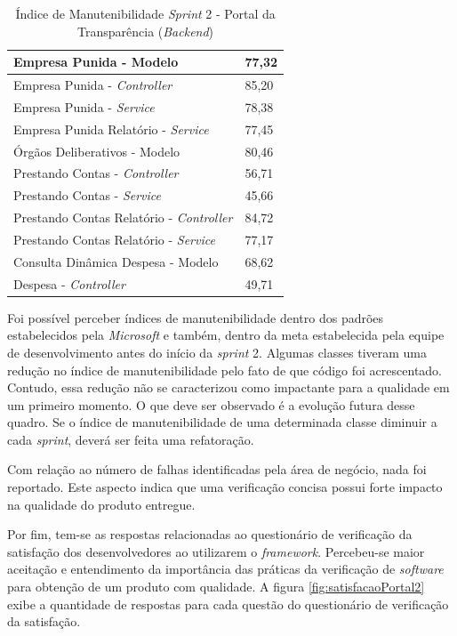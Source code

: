\begin{table}[h]
\caption{Índice de Manutenibilidade \textit{Sprint} 2 - Portal da Transparência (\textit{Backend})}
\centering
\begin{tabular}{ | m{10cm} | m{6cm} | } 
\hline
Empresa Punida - Modelo & 77,32 \\ 
\hline
Empresa Punida - \textit{Controller} & 85,20 \\ 
\hline
Empresa Punida - \textit{Service} & 78,38 \\ 
\hline
Empresa Punida Relatório - \textit{Service} & 77,45 \\ 
\hline
Órgãos Deliberativos - Modelo & 80,46 \\
\hline
Prestando Contas - \textit{Controller} & 56,71 \\
\hline
Prestando Contas - \textit{Service} & 45,66 \\
\hline
Prestando Contas Relatório - \textit{Controller} & 84,72 \\
\hline
Prestando Contas Relatório - \textit{Service} & 77,17 \\
\hline
Consulta Dinâmica Despesa - Modelo & 68,62 \\
\hline
Despesa - \textit{Controller} & 49,71 \\
\hline
\end{tabular}
\label{table:tabela13}
\end{table}

Foi possível perceber índices de manutenibilidade dentro dos padrões estabelecidos pela \textit{Microsoft} e também, dentro da meta estabelecida pela equipe de desenvolvimento antes do início da \textit{sprint} 2. Algumas classes tiveram uma redução no índice de manutenibilidade pelo fato de que código foi acrescentado. Contudo, essa redução não se caracterizou como impactante para a qualidade em um primeiro momento. O que deve ser observado é a evolução futura desse quadro. Se o índice de manutenibilidade de uma determinada classe diminuir a cada \textit{sprint}, deverá ser feita uma refatoração.

Com relação ao número de falhas identificadas pela área de negócio, nada foi reportado. Este aspecto indica que uma verificação concisa possui forte impacto na qualidade do produto entregue.

Por fim, tem-se as respostas relacionadas ao questionário de verificação da satisfação dos desenvolvedores ao utilizarem o \textit{framework}. Percebeu-se maior aceitação e entendimento da importância das práticas da verificação de \textit{software} para obtenção de um produto com qualidade. A figura \ref{fig:satisfacaoPortal2} exibe a quantidade de respostas para cada questão do questionário de verificação da satisfação.

